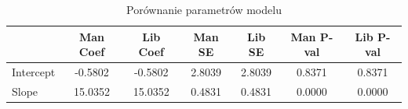 \begin{table}[H]
\caption{Porównanie parametrów modelu}
\label{tab:params}
\begin{tabular}{lcccccc}
\toprule
 & Man Coef & Lib Coef & Man SE & Lib SE & Man P-val & Lib P-val \\
\midrule
Intercept & -0.5802 & -0.5802 & 2.8039 & 2.8039 & 0.8371 & 0.8371 \\
Slope & 15.0352 & 15.0352 & 0.4831 & 0.4831 & 0.0000 & 0.0000 \\
\bottomrule
\end{tabular}
\end{table}
